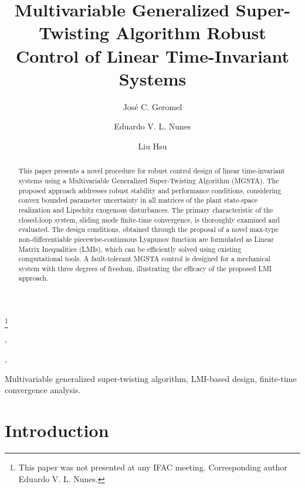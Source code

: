 \documentclass[twocolumn]{autarc_LH}
\begin{document}
\begin{frontmatter}

\title{Multivariable Generalized Super-Twisting Algorithm Robust Control of Linear Time-Invariant Systems}

\thanks[footnoteinfo]{This paper was not presented at any IFAC 
meeting. Corresponding author Eduardo V. L. Nunes.}

\author[UNICAMP]{Jos\'{e} C. Geromel}, 
\author[UFRJ]{Eduardo V. L. Nunes},       
\author[UFRJ]{Liu Hsu}  

\address[UNICAMP]{School of Electrical and Computer Engineering, UNICAMP, SP-Brazil}                                             
\address[UFRJ]{Department of Electrical Engineering, COPPE, Federal University of Rio de Janeiro, RJ-Brazil}   
 
\begin{keyword}                         
Multivariable generalized super-twisting algorithm, LMI-based design, finite-time convergence analysis.        
\end{keyword}                             

\begin{abstract}              

This paper presents a novel procedure for robust control design of linear time-invariant systems using a Multivariable Generalized Super-Twisting Algorithm (MGSTA). The proposed approach addresses robust stability and performance conditions, considering convex bounded parameter uncertainty in all matrices of the plant state-space realization and Lipschitz exogenous disturbances. The primary characteristic of the closed-loop system, sliding mode finite-time convergence, is thoroughly examined and evaluated. The design conditions, obtained through the proposal of a novel max-type non-differentiable piecewise-continuous Lyapunov function are formulated as Linear Matrix Inequalities (LMIs), which can be efficiently solved using existing computational tools. A fault-tolerant MGSTA control is designed for a mechanical system with three degrees of freedom, illustrating the efficacy of the proposed LMI approach.

\end{abstract}

\end{frontmatter}



\section{Introduction}
\end{document}
